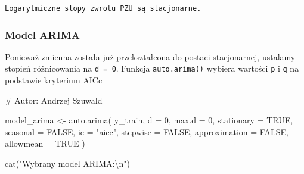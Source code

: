 \documentclass[
  polish,
  letterpaper,
  DIV=11,
  numbers=noendperiod]{scrartcl}
\newenvironment{Shaded}{\begin{snugshade}}{\end{snugshade}}
\newcommand{\AttributeTok}[1]{\textcolor[rgb]{0.40,0.45,0.13}{#1}}
\newcommand{\CommentTok}[1]{\textcolor[rgb]{0.37,0.37,0.37}{#1}}
\newcommand{\ConstantTok}[1]{\textcolor[rgb]{0.56,0.35,0.01}{#1}}
\newcommand{\ControlFlowTok}[1]{\textcolor[rgb]{0.00,0.23,0.31}{\textbf{#1}}}
\newcommand{\DecValTok}[1]{\textcolor[rgb]{0.68,0.00,0.00}{#1}}
\newcommand{\FloatTok}[1]{\textcolor[rgb]{0.68,0.00,0.00}{#1}}
\newcommand{\FunctionTok}[1]{\textcolor[rgb]{0.28,0.35,0.67}{#1}}
\newcommand{\NormalTok}[1]{\textcolor[rgb]{0.00,0.23,0.31}{#1}}
\newcommand{\OtherTok}[1]{\textcolor[rgb]{0.00,0.23,0.31}{#1}}
\newcommand{\SpecialCharTok}[1]{\textcolor[rgb]{0.37,0.37,0.37}{#1}}
\newcommand{\StringTok}[1]{\textcolor[rgb]{0.13,0.47,0.30}{#1}}
\begin{document}
\begin{Shaded}
\end{Shaded}

\begin{verbatim}
Logarytmiczne stopy zwrotu PZU są stacjonarne.
\end{verbatim}

\subsubsection{Model ARIMA}\label{model-arima}

Ponieważ zmienna została już przekształcona do postaci stacjonarnej,
ustalamy stopień różnicowania na \texttt{d\ =\ 0}. Funkcja
\texttt{auto.arima()} wybiera wartości \texttt{p} i \texttt{q} na
podstawie kryterium AICc

\begin{Shaded}
\begin{Highlighting}[]
\CommentTok{\# Autor: Andrzej Szuwald}

\NormalTok{model\_arima }\OtherTok{\textless{}{-}} \FunctionTok{auto.arima}\NormalTok{(}
\NormalTok{  y\_train,}
  \AttributeTok{d =} \DecValTok{0}\NormalTok{,}
  \AttributeTok{max.d =} \DecValTok{0}\NormalTok{,}
  \AttributeTok{stationary =} \ConstantTok{TRUE}\NormalTok{,}
  \AttributeTok{seasonal =} \ConstantTok{FALSE}\NormalTok{,}
  \AttributeTok{ic =} \StringTok{"aicc"}\NormalTok{,}
  \AttributeTok{stepwise =} \ConstantTok{FALSE}\NormalTok{,}
  \AttributeTok{approximation =} \ConstantTok{FALSE}\NormalTok{,}
  \AttributeTok{allowmean =} \ConstantTok{TRUE}
\NormalTok{)}

\FunctionTok{cat}\NormalTok{(}\StringTok{"Wybrany model ARIMA:}\SpecialCharTok{\textbackslash{}n}\StringTok{"}\NormalTok{)}
\end{Highlighting}
\end{Shaded}
\end{document}
